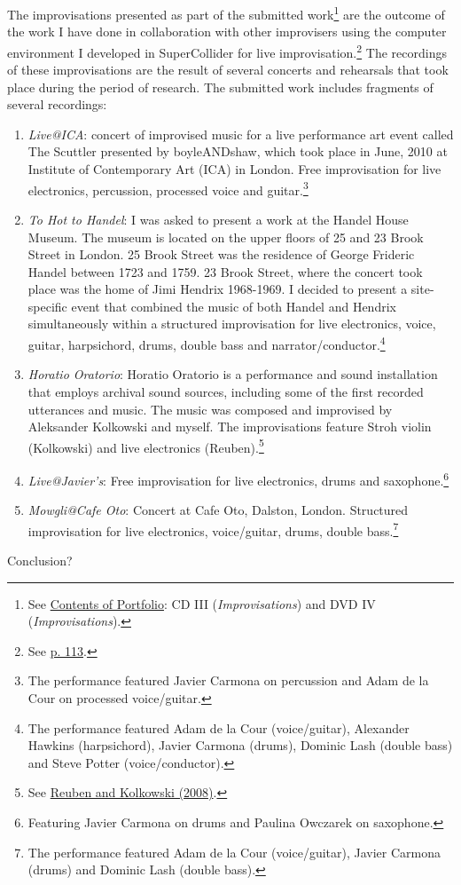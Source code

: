 The improvisations presented as part of the submitted work\footnote{See \hyperlink{portfolio}{Contents of Portfolio}: CD III (\emph{Improvisations}) and DVD IV (\emph{Improvisations}).} are the outcome of the work I have done in collaboration with other improvisers using the computer environment I developed in SuperCollider for live improvisation.\footnote{See \hyperlink{improvprog}{p. 113}.} The recordings of these improvisations are the result of several concerts and rehearsals that took place during the period of research. The submitted work includes fragments of several recordings:
\begin{enumerate} 
\item \emph{Live@ICA}: concert of improvised music for a live performance art event called The Scuttler presented by boyleANDshaw, which took place in June, 2010 at Institute of Contemporary Art (ICA) in London. Free improvisation for live electronics, percussion, processed voice and guitar.\footnote{The performance featured Javier Carmona on percussion and Adam de la Cour on processed voice/guitar.}
\item \emph{To Hot to Handel}: I was asked to present a work at the Handel House Museum. The museum is located on the upper floors of 25 and 23 Brook Street in London. 25 Brook Street was the residence of George Frideric Handel between 1723 and 1759. 23 Brook Street, where the concert took place was the home of Jimi Hendrix 1968-1969. I decided to present a site-specific event that combined the music of both Handel and Hendrix simultaneously within a structured improvisation for live electronics, voice, guitar, harpsichord, drums, double bass and narrator/conductor.\footnote{The performance featured Adam de la Cour (voice/guitar), Alexander Hawkins (harpsichord), Javier Carmona (drums), Dominic Lash (double bass) and Steve Potter (voice/conductor).}
\item \emph{Horatio Oratorio}: Horatio Oratorio is a performance and sound installation that employs archival sound sources, including some of the first recorded utterances and music. The music was composed and improvised by Aleksander Kolkowski and myself. The improvisations feature Stroh violin (Kolkowski) and live electronics (Reuben).\footnote{See \hyperlink{reuben}{Reuben and Kolkowski (2008)}.}
\item \emph{Live@Javier's}: Free improvisation for live electronics, drums and saxophone.\footnote{Featuring Javier Carmona on drums and Paulina Owczarek on saxophone.}
\item \emph{Mowgli@Cafe Oto}: Concert at Cafe Oto, Dalston, London. Structured improvisation for live electronics, voice/guitar, drums, double bass.\footnote{The performance featured Adam de la Cour (voice/guitar), Javier Carmona (drums) and Dominic Lash (double bass).}
\end{enumerate}

\indent

Conclusion?

\label{ch:compositions}